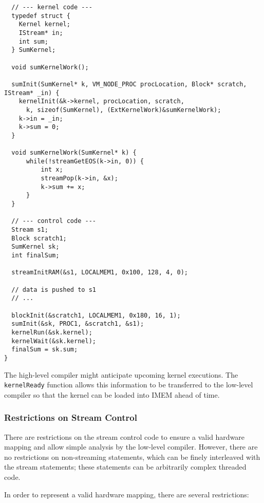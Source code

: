 {\small
\begin{verbatim}
  // --- kernel code ---
  typedef struct {
    Kernel kernel;
    IStream* in;
    int sum;
  } SumKernel;

  void sumKernelWork();
  
  sumInit(SumKernel* k, VM_NODE_PROC procLocation, Block* scratch, IStream* _in) {
    kernelInit(&k->kernel, procLocation, scratch,
      k, sizeof(SumKernel), (ExtKernelWork)&sumKernelWork); 
    k->in = _in;
    k->sum = 0;
  }

  void sumKernelWork(SumKernel* k) {
      while(!streamGetEOS(k->in, 0)) {
          int x;
          streamPop(k->in, &x);
          k->sum += x;
      }
  }

  // --- control code ---
  Stream s1;
  Block scratch1;
  SumKernel sk;
  int finalSum;

  streamInitRAM(&s1, LOCALMEM1, 0x100, 128, 4, 0);
  
  // data is pushed to s1
  // ...

  blockInit(&scratch1, LOCALMEM1, 0x180, 16, 1);
  sumInit(&sk, PROC1, &scratch1, &s1);
  kernelRun(&sk.kernel);
  kernelWait(&sk.kernel);
  finalSum = sk.sum;
}\end{verbatim}}


The high-level compiler might anticipate upcoming kernel executions. The {\tt kernelReady} function allows this information to be transferred to the low-level compiler so that the kernel can be loaded into IMEM ahead of time.

\subsubsection{Restrictions on Stream Control}

There are restrictions on the stream control code to ensure a valid hardware mapping and allow simple analysis by the low-level compiler. However, there are no restrictions on non-streaming statements, which can be finely interleaved with the stream statements; these statements can be arbitrarily complex threaded code.

In order to represent a valid hardware mapping, there are several restrictions:

